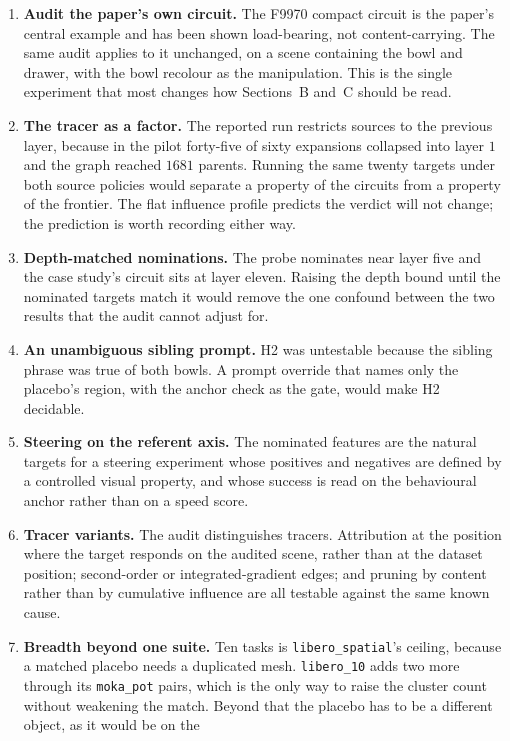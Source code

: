 \begin{enumerate}
\item \textbf{Audit the paper's own circuit.} The F9970 compact circuit is the
paper's central example and has been shown load-bearing, not content-carrying.
The same audit applies to it unchanged, on a scene containing the bowl and
drawer, with the bowl recolour as the manipulation. This is the single
experiment that most changes how Sections~B and~C should be read.
\item \textbf{The tracer as a factor.} The reported run restricts sources to
the previous layer, because in the pilot forty-five of sixty expansions
collapsed into layer $1$ and the graph reached $1681$ parents. Running the same
twenty targets under both source policies would separate a property of the
circuits from a property of the frontier. The flat influence profile predicts
the verdict will not change; the prediction is worth recording either way.
\item \textbf{Depth-matched nominations.} The probe nominates near layer five
and the case study's circuit sits at layer eleven. Raising the depth bound
until the nominated targets match it would remove the one confound between the
two results that the audit cannot adjust for.
\item \textbf{An unambiguous sibling prompt.} H2 was untestable because the
sibling phrase was true of both bowls. A prompt override that names only the
placebo's region, with the anchor check as the gate, would make H2 decidable.
\item \textbf{Steering on the referent axis.} The nominated features are the
natural targets for a steering experiment whose positives and negatives are
defined by a controlled visual property, and whose success is read on the
behavioural anchor rather than on a speed score.
\item \textbf{Tracer variants.} The audit distinguishes tracers. Attribution at
the position where the target responds on the audited scene, rather than at
the dataset position; second-order or integrated-gradient edges; and pruning by
content rather than by cumulative influence are all testable against the same
known cause.
\item \textbf{Breadth beyond one suite.} Ten tasks is
\texttt{libero\_spatial}'s ceiling, because a matched placebo needs a duplicated
mesh. \texttt{libero\_10} adds two more through its \texttt{moka\_pot} pairs,
which is the only way to raise the cluster count without weakening the match.
Beyond that the placebo has to be a different object, as it would be on the

\end{enumerate}
